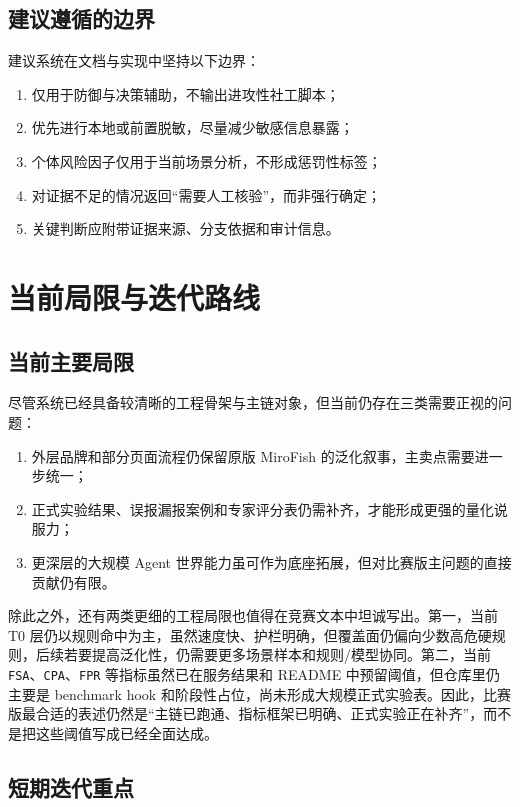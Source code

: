 \documentclass[12pt,a4paper]{ctexart}
\begin{document}
\subsection{建议遵循的边界}

建议系统在文档与实现中坚持以下边界：
\begin{enumerate}[leftmargin=2em]
  \item 仅用于防御与决策辅助，不输出进攻性社工脚本；
  \item 优先进行本地或前置脱敏，尽量减少敏感信息暴露；
  \item 个体风险因子仅用于当前场景分析，不形成惩罚性标签；
  \item 对证据不足的情况返回“需要人工核验”，而非强行确定；
  \item 关键判断应附带证据来源、分支依据和审计信息。
\end{enumerate}

\section{当前局限与迭代路线}

\subsection{当前主要局限}

尽管系统已经具备较清晰的工程骨架与主链对象，但当前仍存在三类需要正视的问题：
\begin{enumerate}[leftmargin=2em]
  \item 外层品牌和部分页面流程仍保留原版 MiroFish 的泛化叙事，主卖点需要进一步统一；
  \item 正式实验结果、误报漏报案例和专家评分表仍需补齐，才能形成更强的量化说服力；
  \item 更深层的大规模 Agent 世界能力虽可作为底座拓展，但对比赛版主问题的直接贡献仍有限。
\end{enumerate}

除此之外，还有两类更细的工程局限也值得在竞赛文本中坦诚写出。第一，当前 T0 层仍以规则命中为主，虽然速度快、护栏明确，但覆盖面仍偏向少数高危硬规则，后续若要提高泛化性，仍需要更多场景样本和规则/模型协同。第二，当前 \texttt{FSA}、\texttt{CPA}、\texttt{FPR} 等指标虽然已在服务结果和 README 中预留阈值，但仓库里仍主要是 benchmark hook 和阶段性占位，尚未形成大规模正式实验表。因此，比赛版最合适的表述仍然是“主链已跑通、指标框架已明确、正式实验正在补齐”，而不是把这些阈值写成已经全面达成。

\subsection{短期迭代重点}
\end{document}

